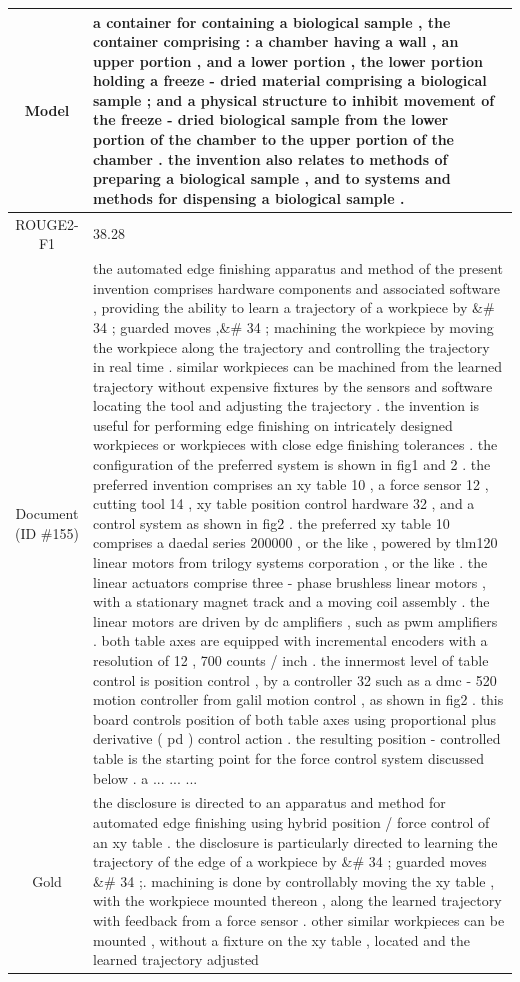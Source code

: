 \begin{table}[bth!]
\begin{tabular}{c|p{}}
\\ \hline
Model & 
a container for containing a biological sample , the container comprising : a chamber having a wall , an upper portion , and a lower portion , the lower portion holding a freeze - dried material comprising a biological sample ; and a physical structure to inhibit movement of the freeze - dried biological sample from the lower portion of the chamber to the upper portion of the chamber . the invention also relates to methods of preparing a biological sample , and to systems and methods for dispensing a biological sample .
\\ \hline
ROUGE2-F1 & 
38.28
\\ \hline
\makecell{Document\\(ID \#155)} & 
the automated edge finishing apparatus and method of the present invention comprises hardware components and associated software , providing the ability to learn a trajectory of a workpiece by \&\# 34 ; guarded moves ,\&\# 34 ; machining the workpiece by moving the workpiece along the trajectory and controlling the trajectory in real time . similar workpieces can be machined from the learned trajectory without expensive fixtures by the sensors and software locating the tool and adjusting the trajectory . the invention is useful for performing edge finishing on intricately designed workpieces or workpieces with close edge finishing tolerances . the configuration of the preferred system is shown in fig1 and 2 . the preferred invention comprises an xy table 10 , a force sensor 12 , cutting tool 14 , xy table position control hardware 32 , and a control system as shown in fig2 . the preferred xy table 10 comprises a daedal series 200000 , or the like , powered by tlm120 linear motors from trilogy systems corporation , or the like . the linear actuators comprise three - phase brushless linear motors , with a stationary magnet track and a moving coil assembly . the linear motors are driven by dc amplifiers , such as pwm amplifiers . both table axes are equipped with incremental encoders with a resolution of 12 , 700 counts / inch . the innermost level of table control is position control , by a controller 32 such as a dmc - 520 motion controller from galil motion control , as shown in fig2 . this board controls position of both table axes using proportional plus derivative ( pd ) control action . the resulting position - controlled table is the starting point for the force control system discussed below . a ... ... ... 
\\ \hline
Gold & 
the disclosure is directed to an apparatus and method for automated edge finishing using hybrid position / force control of an xy table . the disclosure is particularly directed to learning the trajectory of the edge of a workpiece by \&\# 34 ; guarded moves \&\# 34 ;. machining is done by controllably moving the xy table , with the workpiece mounted thereon , along the learned trajectory with feedback from a force sensor . other similar workpieces can be mounted , without a fixture on the xy table , located and the learned trajectory adjusted

\end{tabular}
\end{table}
